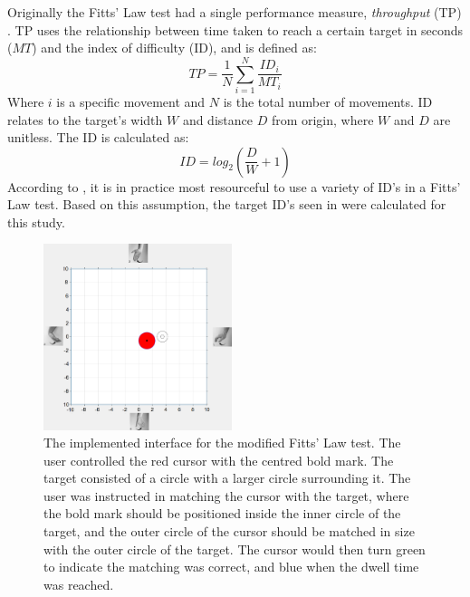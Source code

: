 \vspace{-0.2cm}
Originally the Fitts' Law test had a single performance measure, \textit{throughput} (TP) \cite{Fitts1954}. TP uses the relationship between time taken to reach a certain target in seconds ($MT$) and the index of difficulty (ID), and is defined as:
\begin{equation} \label{eq:TP}
TP=\frac{1}{N}\sum_{i=1}^{N} \frac{ID_i}{MT_i} 
\end{equation}
\noindent Where $i$ is a specific movement and $N$ is the total number of movements. ID relates to the target's width $W$ and distance $D$ from origin, where $W$ and $D$ are unitless. The ID is calculated as: 
\begin{equation} \label{eq:ID}
ID=log_2(\frac{D}{W}+1)
\end{equation}
\noindent According to \cite{Scheme2013a}, it is in practice most resourceful to use a variety of ID's in a Fitts' Law test. Based on this assumption, the target ID's seen in  were calculated for this study.
\begin{figure}[H] 
	\includegraphics[width=0.49\textwidth]{figures/xBackground/perftestGUI}
	\caption{The implemented interface for the modified Fitts' Law test. The user controlled the red cursor with the centred bold mark. The target consisted of a circle with a larger circle surrounding it. The user was instructed in matching the cursor with the target, where the bold mark should be positioned inside the inner circle of the target, and the outer circle of the cursor should be matched in size with the outer circle of the target. The cursor would then turn green to indicate the matching was correct, and blue when the dwell time was reached.}
	\label{fig:fittsLawTask}
\end{figure}
